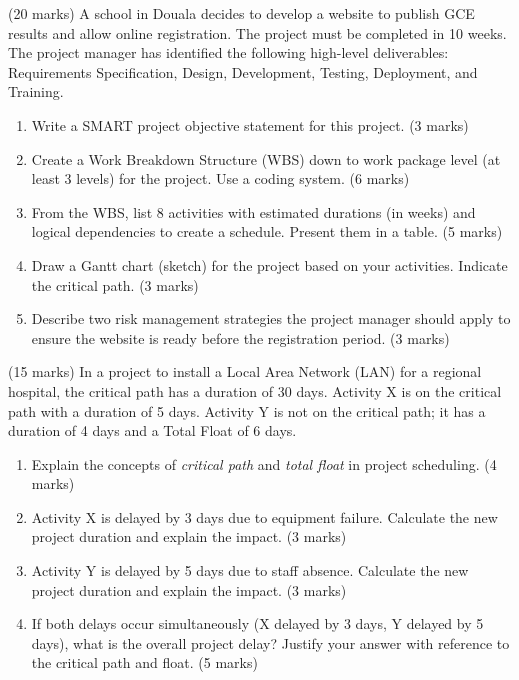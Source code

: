 \documentclass[11pt]{article}
\begin{document}
\begin{exercice} \hfill (20 marks)
A school in Douala decides to develop a website to publish GCE results and allow online registration. The project must be completed in 10 weeks. The project manager has identified the following high-level deliverables: Requirements Specification, Design, Development, Testing, Deployment, and Training.

\begin{enumerate}
    \item Write a SMART project objective statement for this project. \hfill (3 marks)
    \item Create a Work Breakdown Structure (WBS) down to work package level (at least 3 levels) for the project. Use a coding system. \hfill (6 marks)
    \item From the WBS, list 8 activities with estimated durations (in weeks) and logical dependencies to create a schedule. Present them in a table. \hfill (5 marks)
    \item Draw a Gantt chart (sketch) for the project based on your activities. Indicate the critical path. \hfill (3 marks)
    \item Describe two risk management strategies the project manager should apply to ensure the website is ready before the registration period. \hfill (3 marks)
\end{enumerate}
\end{exercice}

\begin{exercice} \hfill (15 marks)
In a project to install a Local Area Network (LAN) for a regional hospital, the critical path has a duration of 30 days. Activity X is on the critical path with a duration of 5 days. Activity Y is not on the critical path; it has a duration of 4 days and a Total Float of 6 days.

\begin{enumerate}
    \item Explain the concepts of \emph{critical path} and \emph{total float} in project scheduling. \hfill (4 marks)
    \item Activity X is delayed by 3 days due to equipment failure. Calculate the new project duration and explain the impact. \hfill (3 marks)
    \item Activity Y is delayed by 5 days due to staff absence. Calculate the new project duration and explain the impact. \hfill (3 marks)
    \item If both delays occur simultaneously (X delayed by 3 days, Y delayed by 5 days), what is the overall project delay? Justify your answer with reference to the critical path and float. \hfill (5 marks)
\end{enumerate}
\end{exercice}
\end{document}
